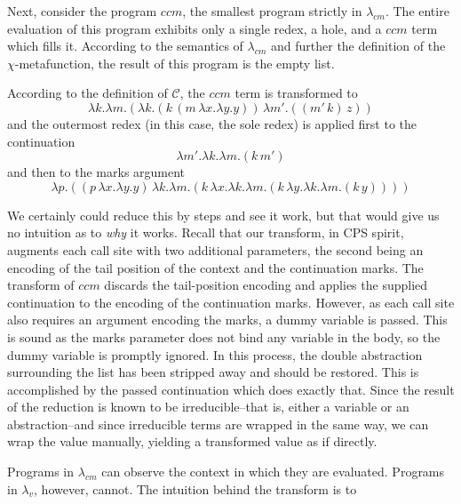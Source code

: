 \documentclass[ms,electronic,twosidetoc,letterpaper,chaptercenter,parttop]{byumsphd}
\begin{document}
Next, consider the program $ccm$, the smallest program strictly in $\lambda_{cm}$. 
The entire evaluation of this program exhibits only a single redex, a hole, and a $ccm$ 
term which fills it. According to the semantics of $\lambda_{cm}$ and further the definition of the 
$\chi$-metafunction, the result of this program is the empty list.

According to the definition of $\mathcal{C}$, the $ccm$ term is transformed to
\[
\lambda k.\lambda m.(\lambda k.(k\,(m\,\lambda x.\lambda y.y))\,\lambda m'.((m'\,k)\,z))
\]
and the outermost redex (in this case, the sole redex) is applied first to the continuation
\[
\lambda m'.\lambda k.\lambda m.(k\,m')
\]
and then to the marks argument
\[
\lambda p.((p\,\lambda x.\lambda y.y)\,\lambda k.\lambda m.(k\,\lambda x.\lambda k.\lambda m.(k\,\lambda y.\lambda k.\lambda m.(k\,y))))
\]

We certainly could reduce this by steps and see it work, but that would give us no intuition as to \emph{why} it works. Recall that our transform, in CPS spirit, augments each call site with two additional parameters, the second being an encoding of the tail position of the context and the continuation marks. The transform of $ccm$ discards the tail-position encoding and applies the supplied continuation to the encoding of the continuation marks. However, as each call site also requires an argument encoding the marks, a dummy variable is passed. This is sound as the marks parameter does not bind any variable in the body, so the dummy variable is promptly ignored. In this process, the double abstraction surrounding the list has been stripped away and should be restored. This is accomplished by the passed continuation which does exactly that. Since the result of the reduction is known to be irreducible--that is, either a variable or an abstraction--and since irreducible terms are wrapped in the same way, we can wrap the value manually, yielding a transformed value as if directly.

Programs in $\lambda_{cm}$ can observe the context in which they are evaluated. Programs in $\lambda_v$, however, cannot. The intuition behind the transform is to 



\end{document}
